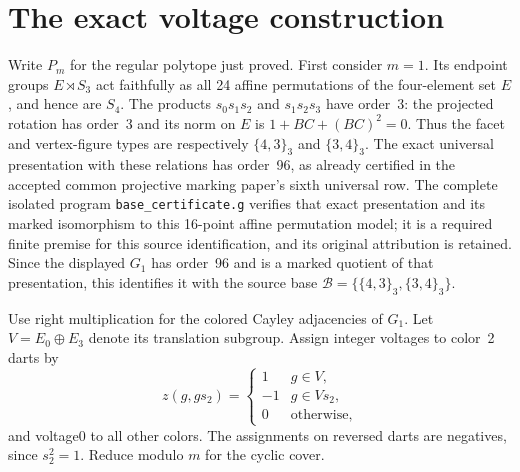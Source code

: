 \documentclass[a4paper,11pt]{article}
\begin{document}
\section{The exact voltage construction}
Write $P_m$ for the regular polytope just proved. First consider $m=1$.
Its endpoint groups $E\rtimes S_3$ act faithfully as all 24 affine
permutations of the four-element set $E$, and hence are $S_4$. The
products $s_0s_1s_2$ and $s_1s_2s_3$ have order~3: the projected rotation
has order~3 and its norm on $E$ is $1+BC+(BC)^2=0$. Thus the facet and
vertex-figure types are respectively $\{4,3\}_3$ and $\{3,4\}_3$.
The exact universal presentation with these relations has order~96,
as already certified in the accepted common projective marking paper's
sixth universal row. The complete isolated program \texttt{base\_certificate.g} verifies that
exact presentation and its marked isomorphism to this 16-point affine
permutation model; it is a required finite premise for this source
identification, and its original attribution is retained. Since the displayed
$G_1$ has order~96 and is a marked quotient of that presentation, this
identifies it with the source base
$\mathcal B=\{\{4,3\}_3,\{3,4\}_3\}$.

Use right multiplication for the colored Cayley adjacencies of $G_1$.
Let $V=E_0\oplus E_3$ denote its translation subgroup. Assign integer
voltages to color~2 darts by
\[
z(g,gs_2)=\begin{cases}1&g\in V,\\-1&g\in Vs_2,\\0&\text{otherwise},\end{cases}
\]
and voltage0 to all other colors. The assignments on reversed darts
are negatives, since $s_2^2=1$. Reduce modulo $m$ for the cyclic cover.
\end{document}
